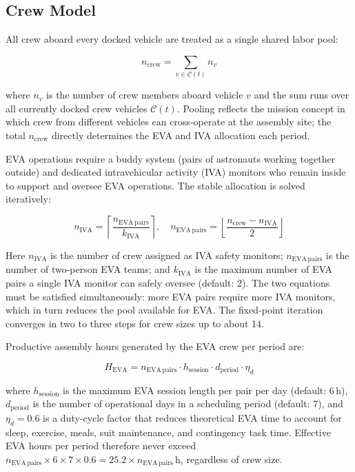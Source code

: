 \subsection{Crew Model}

All crew aboard every docked vehicle are treated as a single
shared labor pool:

\begin{equation}
  n_{\mathrm{crew}} = \sum_{v \in \mathcal{C}(t)} n_v
\end{equation}

\noindent where $n_v$ is the number of crew members aboard vehicle
$v$ and the sum runs over all currently docked crew vehicles
$\mathcal{C}(t)$.
Pooling reflects the mission concept in which crew from different
vehicles can cross-operate at the assembly site; the total
$n_{\mathrm{crew}}$ directly determines the EVA and IVA allocation
each period.

EVA operations require a buddy system (pairs of astronauts working
together outside) and dedicated intravehicular activity (IVA)
monitors who remain inside to support and oversee EVA operations.
The stable allocation is solved iteratively:

\begin{equation}
  n_{\mathrm{IVA}} = \left\lceil
    \frac{n_{\mathrm{EVA\,pairs}}}{k_{\mathrm{IVA}}}
  \right\rceil, \quad
  n_{\mathrm{EVA\,pairs}} = \left\lfloor
    \frac{n_{\mathrm{crew}} - n_{\mathrm{IVA}}}{2}
  \right\rfloor
  \label{eq:eva}
\end{equation}

\noindent Here $n_{\mathrm{IVA}}$ is the number of crew assigned as
IVA safety monitors; $n_{\mathrm{EVA\,pairs}}$ is the number of
two-person EVA teams; and $k_{\mathrm{IVA}}$ is the maximum number
of EVA pairs a single IVA monitor can safely oversee (default: 2).
The two equations must be satisfied simultaneously: more EVA pairs
require more IVA monitors, which in turn reduces the pool available
for EVA.
The fixed-point iteration converges in two to three steps for
crew sizes up to about 14.

Productive assembly hours generated by the EVA crew per period are:

\begin{equation}
  H_{\mathrm{EVA}} = n_{\mathrm{EVA\,pairs}} \cdot h_{\mathrm{session}}
                     \cdot d_{\mathrm{period}} \cdot \eta_d
  \label{eq:crew_hours}
\end{equation}

\noindent where $h_{\mathrm{session}}$ is the maximum EVA session
length per pair per day (default: 6\,h), $d_{\mathrm{period}}$ is
the number of operational days in a scheduling period (default: 7),
and $\eta_d = 0.6$ is a duty-cycle factor that reduces theoretical
EVA time to account for sleep, exercise, meals, suit maintenance,
and contingency task time.
Effective EVA hours per period therefore never exceed
$n_{\mathrm{EVA\,pairs}} \times 6 \times 7 \times 0.6 =
25.2 \times n_{\mathrm{EVA\,pairs}}$\,h, regardless of crew size.

